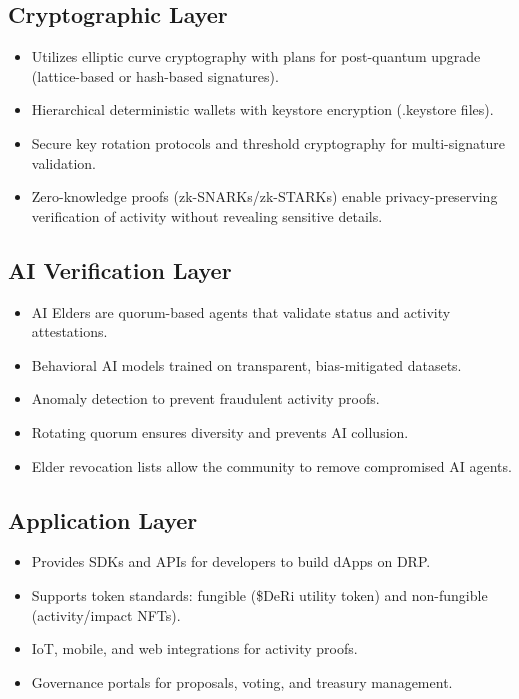 \documentclass[11pt,a4paper]{article}
\begin{document}
\subsection{Cryptographic Layer}
\begin{itemize}
    \item Utilizes elliptic curve cryptography with plans for post-quantum upgrade (lattice-based or hash-based signatures).  
    \item Hierarchical deterministic wallets with keystore encryption (.keystore files).  
    \item Secure key rotation protocols and threshold cryptography for multi-signature validation.  
    \item Zero-knowledge proofs (zk-SNARKs/zk-STARKs) enable privacy-preserving verification of activity without revealing sensitive details.  
\end{itemize}

\subsection{AI Verification Layer}
\begin{itemize}
    \item AI Elders are quorum-based agents that validate status and activity attestations.  
    \item Behavioral AI models trained on transparent, bias-mitigated datasets.  
    \item Anomaly detection to prevent fraudulent activity proofs.  
    \item Rotating quorum ensures diversity and prevents AI collusion.  
    \item Elder revocation lists allow the community to remove compromised AI agents.  
\end{itemize}

\subsection{Application Layer}
\begin{itemize}
    \item Provides SDKs and APIs for developers to build dApps on DRP.  
    \item Supports token standards: fungible (\$DeRi utility token) and non-fungible (activity/impact NFTs).  
    \item IoT, mobile, and web integrations for activity proofs.  
    \item Governance portals for proposals, voting, and treasury management.  
\end{itemize}
\end{document}
